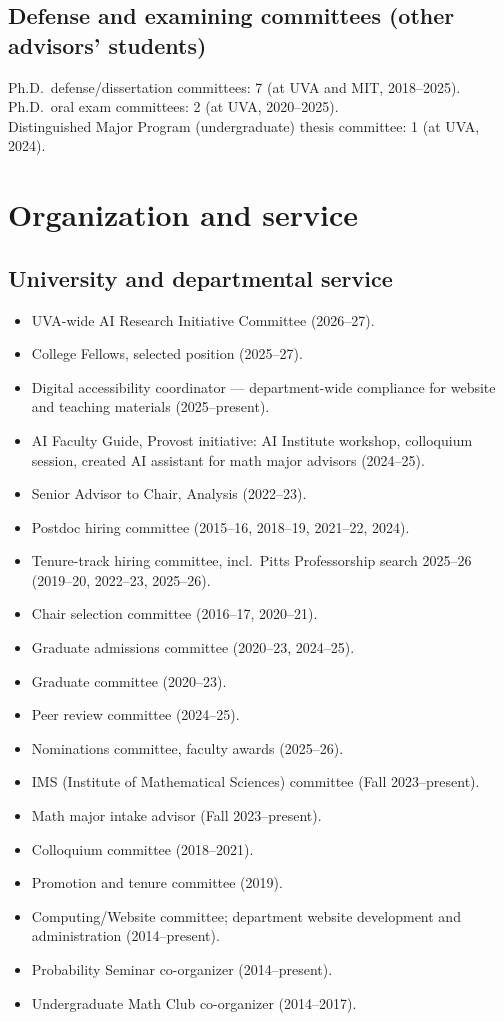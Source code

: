 \documentclass[letterpaper,11pt]{article}
\begin{document}
\subsection*{Defense and examining committees (other advisors' students)}

Ph.D.\ defense/dissertation committees: 7 (at UVA and MIT, 2018--2025).\\
Ph.D.\ oral exam committees: 2 (at UVA, 2020--2025).\\
Distinguished Major Program (undergraduate) thesis committee: 1 (at UVA, 2024).

\section*{Organization and service}

\subsection*{University and departmental service}

\begin{itemize}
	\item UVA-wide AI Research Initiative Committee (2026--27).
	\item College Fellows, selected position (2025--27).
	\item Digital accessibility coordinator --- department-wide compliance for website and teaching materials (2025--present).
	\item AI Faculty Guide, Provost initiative: AI Institute workshop, colloquium session, created AI assistant for math major advisors (2024--25).
	\item Senior Advisor to Chair, Analysis (2022--23).
	\item Postdoc hiring committee (2015--16, 2018--19, 2021--22, 2024).
	\item Tenure-track hiring committee, incl.\ Pitts Professorship search 2025--26 (2019--20, 2022--23, 2025--26).
	\item Chair selection committee (2016--17, 2020--21).
	\item Graduate admissions committee (2020--23, 2024--25).
	\item Graduate committee (2020--23).
	\item Peer review committee (2024--25).
	\item Nominations committee, faculty awards (2025--26).
	\item IMS (Institute of Mathematical Sciences) committee (Fall 2023--present).
	\item Math major intake advisor (Fall 2023--present).
	\item Colloquium committee (2018--2021).
	\item Promotion and tenure committee (2019).
	\item Computing/Website committee; department website development and administration (2014--present).
	\item Probability Seminar co-organizer (2014--present).
	\item Undergraduate Math Club co-organizer (2014--2017).
\end{itemize}
\end{document}
